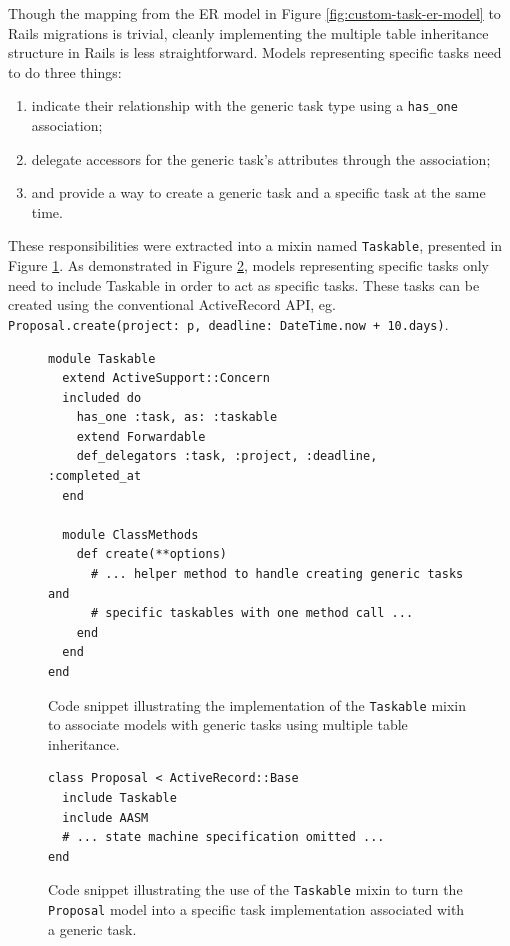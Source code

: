 \documentclass[document.tex]{subfiles}
\begin{document}
Though the mapping from the ER model in Figure \ref{fig:custom-task-er-model} to Rails migrations is trivial, cleanly implementing the multiple table inheritance structure in Rails is less straightforward. Models representing specific tasks need to do three things:
\begin{enumerate}
  \item indicate their relationship with the generic task type using a \verb!has_one! association;
  \item delegate accessors for the generic task’s attributes through the association;
  \item and provide a way to create a generic task and a specific task at the same time.
\end{enumerate}

These responsibilities were extracted into a mixin named \verb!Taskable!, presented in Figure \ref{fig:taskable-mixin-definition}. As demonstrated in Figure \ref{fig:taskable-mixin-example}, models representing specific tasks only need to include Taskable in order to act as specific tasks. These tasks can be created using the conventional ActiveRecord API, eg. \\ \verb!Proposal.create(project: p, deadline: DateTime.now + 10.days)!.

\begin{figure}[!ht]
  \begin{lstlisting}
module Taskable
  extend ActiveSupport::Concern
  included do
    has_one :task, as: :taskable
    extend Forwardable
    def_delegators :task, :project, :deadline, :completed_at
  end

  module ClassMethods
    def create(**options)
      # ... helper method to handle creating generic tasks and
      # specific taskables with one method call ...
    end
  end
end
  \end{lstlisting}
  \cprotect\caption{Code snippet illustrating the implementation of the \verb!Taskable! mixin to associate models with generic tasks using multiple table inheritance.}
  \label{fig:taskable-mixin-definition}
\end{figure}

\begin{figure}[!ht]
  \begin{lstlisting}
class Proposal < ActiveRecord::Base
  include Taskable
  include AASM
  # ... state machine specification omitted ...
end
  \end{lstlisting}
  \cprotect\caption{Code snippet illustrating the use of the \verb!Taskable! mixin to turn the \verb!Proposal! model into a specific task implementation associated with a generic task.}
  \label{fig:taskable-mixin-example}
\end{figure}
\end{document}
